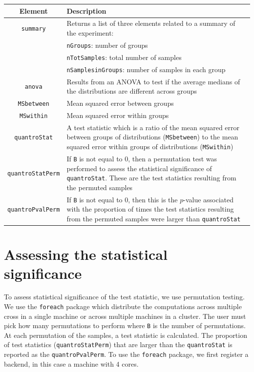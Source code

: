 \documentclass{article}\usepackage[]{graphicx}\usepackage[usenames,dvipsnames]{color}
\begin{document}
\begin{table}[h]
\begin{center}
\begin{tabular}{|c|p{4.5in}|}
\hline
Element & Description \\
\hline
\texttt{summary} & Returns a list of three elements related to a 
summary of the experiment: \\
& \hspace{.5in} \texttt{nGroups}: number of groups  \\
& \hspace{.5in} \texttt{nTotSamples}: total number of samples \\
& \hspace{.5in} \texttt{nSamplesinGroups}: number of samples in each group \\
\texttt{anova} & Results from an ANOVA to test if the average medians of 
the distributions are different across groups \\
\texttt{MSbetween} & Mean squared error between groups \\
\texttt{MSwithin} & Mean squared error within groups \\
\texttt{quantroStat} & A test statistic which is a ratio of the mean 
squared error between groups of distributions (\texttt{MSbetween}) to 
the mean squared error within groups of distributions (\texttt{MSwithin}) \\
\texttt{quantroStatPerm} & If \texttt{B} is not equal to 0, then a permutation 
test was performed to assess the statistical significance of 
\texttt{quantroStat}. These are the test statistics resulting from the 
permuted samples \\
\texttt{quantroPvalPerm} & If \texttt{B} is not equal to 0, then this is 
the $p$-value associated with the proportion of times the test statistics 
resulting from the permuted samples were larger than \texttt{quantroStat} \\
\hline
\end{tabular}
\end{center}
\label{tab:output}
\end{table}




\section{Assessing the statistical significance}
To assess statistical significance of the test statistic, we use 
permutation testing.  We use the \texttt{foreach} package which distribute 
the computations across multiple cross in a single machine or across 
multiple machines in a cluster. The user must pick how many permutations 
to perform where \texttt{B} is the number of permutations. At each 
permutation of the samples, a test statistic is calculated. The proportion 
of test statistics (\texttt{quantroStatPerm}) that are larger than the 
\texttt{quantroStat} is reported as the \texttt{quantroPvalPerm}. To use 
the \texttt{foreach} package, we first register a backend, in this case a 
machine with 4 cores. 
\end{document}
